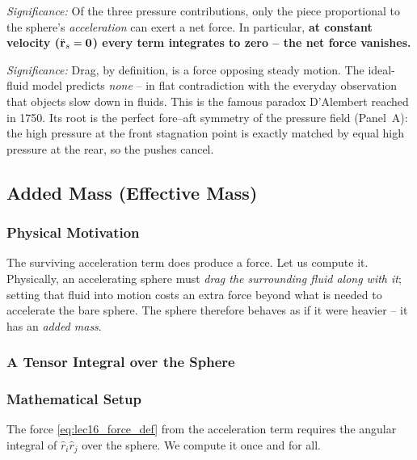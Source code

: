 \documentclass[../main.tex]{subfiles}
\begin{document}
\textit{Significance:} Of the three pressure contributions, only the piece proportional to the sphere's \emph{acceleration} can exert a net force. In particular, \textbf{at constant velocity ($\ddot{\mathbf{r}}_s=\mathbf{0}$) every term integrates to zero -- the net force vanishes.}

\textit{Significance:} Drag, by definition, is a force opposing steady motion. The ideal-fluid model predicts \emph{none} -- in flat contradiction with the everyday observation that objects slow down in fluids. This is the famous paradox D'Alembert reached in 1750. Its root is the perfect fore--aft symmetry of the pressure field (Panel~A): the high pressure at the front stagnation point is exactly matched by equal high pressure at the rear, so the pushes cancel.

\subsection{Added Mass (Effective Mass)}\label{sec:lec16:addedmass}

\subsubsection*{Physical Motivation}
The surviving acceleration term does produce a force. Let us compute it. Physically, an accelerating sphere must \emph{drag the surrounding fluid along with it}; setting that fluid into motion costs an extra force beyond what is needed to accelerate the bare sphere. The sphere therefore behaves as if it were heavier -- it has an \emph{added mass}.

\subsubsection{A Tensor Integral over the Sphere}

\subsubsection*{Mathematical Setup}
The force \eqref{eq:lec16_force_def} from the acceleration term requires the angular integral of $\hat r_i \hat r_j$ over the sphere. We compute it once and for all.
\end{document}
